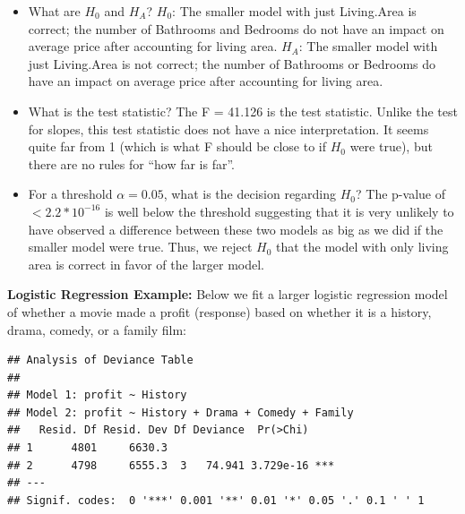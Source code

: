 \documentclass[
]{book}
\newenvironment{Shaded}{\begin{snugshade}}{\end{snugshade}}
\newcommand{\CommentTok}[1]{\textcolor[rgb]{0.56,0.35,0.01}{\textit{#1}}}
\newcommand{\DataTypeTok}[1]{\textcolor[rgb]{0.13,0.29,0.53}{#1}}
\newcommand{\KeywordTok}[1]{\textcolor[rgb]{0.13,0.29,0.53}{\textbf{#1}}}
\newcommand{\NormalTok}[1]{#1}
\newcommand{\OperatorTok}[1]{\textcolor[rgb]{0.81,0.36,0.00}{\textbf{#1}}}
\newcommand{\StringTok}[1]{\textcolor[rgb]{0.31,0.60,0.02}{#1}}
\begin{document}
\begin{itemize}
\item
  What are \(H_0\) and \(H_A\)?
  \(H_0\): The smaller model with just Living.Area is correct; the number of Bathrooms and Bedrooms do not have an impact on average price after accounting for living area.
  \(H_A\): The smaller model with just Living.Area is not correct; the number of Bathrooms or Bedrooms do have an impact on average price after accounting for living area.
\item
  What is the test statistic?
  The F = 41.126 is the test statistic. Unlike the test for slopes, this test statistic does not have a nice interpretation. It seems quite far from 1 (which is what F should be close to if \(H_0\) were true), but there are no rules for ``how far is far''.
\item
  For a threshold \(\alpha = 0.05\), what is the decision regarding \(H_0\)?
  The p-value of \(< 2.2*10^{-16}\) is well below the threshold suggesting that it is very unlikely to have observed a difference between these two models as big as we did if the smaller model were true. Thus, we reject \(H_0\) that the model with only living area is correct in favor of the larger model.
\end{itemize}

\textbf{Logistic Regression Example:} Below we fit a larger logistic regression model of whether a movie made a profit (response) based on whether it is a history, drama, comedy, or a family film:

\begin{Shaded}
\end{Shaded}

\begin{verbatim}
## Analysis of Deviance Table
## 
## Model 1: profit ~ History
## Model 2: profit ~ History + Drama + Comedy + Family
##   Resid. Df Resid. Dev Df Deviance  Pr(>Chi)    
## 1      4801     6630.3                          
## 2      4798     6555.3  3   74.941 3.729e-16 ***
## ---
## Signif. codes:  0 '***' 0.001 '**' 0.01 '*' 0.05 '.' 0.1 ' ' 1
\end{verbatim}
\end{document}

